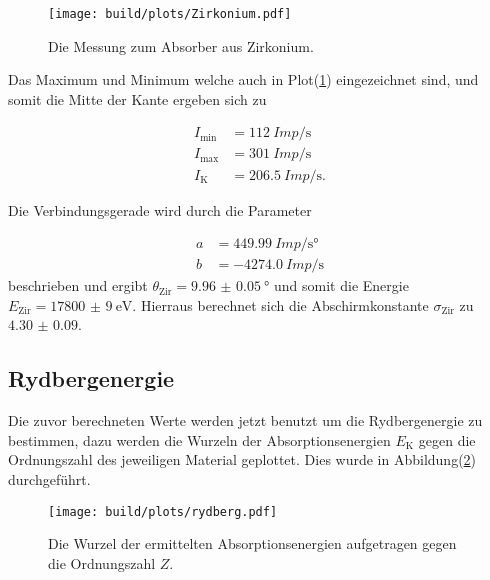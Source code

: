           \begin{figure}[H]
            \centering
            \texttt{[image: build/plots/Zirkonium.pdf]}
            \caption{Die Messung zum Absorber aus Zirkonium.}
            \label{fig:zirkonium}
          \end{figure}

          \noindent Das Maximum und Minimum welche auch in Plot(\ref{fig:zirkonium}) eingezeichnet sind, und somit die Mitte der Kante ergeben sich 
          zu

          \begin{align*}
              I_{\text{min}} &= \SI{112}{Imp\per\second}\\
              I_{\text{max}} &= \SI{301}{Imp\per\second}\\
              I_{\text{K}} &= \SI{206.5}{Imp\per\second} .
          \end{align*}

          \noindent Die Verbindungsgerade wird durch die Parameter 

          \begin{align*}
              a & = \SI{449.99}{Imp\per\second\degree}\\
              b & = \SI{-4274.0}{Imp\per\second}
          \end{align*}
          \noindent beschrieben und ergibt $\theta_{\text{Zir}} = \SI{9.96(5)}{\degree}$ und somit die Energie $E_{\text{Zir}} = \SI{17800(9)}{\electronvolt}$. 
          Hierraus berechnet sich die Abschirmkonstante $\sigma_{\text{Zir}}$ zu $ \num{4.30(9)}$.


    \subsection{Rydbergenergie}

          \noindent Die zuvor berechneten Werte werden jetzt benutzt um die Rydbergenergie zu bestimmen, dazu werden die Wurzeln der 
          Absorptionsenergien $E_{\text{K}}$ gegen die Ordnungszahl des jeweiligen Material geplottet. Dies wurde in 
          Abbildung(\ref{fig:rydberg}) durchgeführt.

          \begin{figure}[H]
            \centering
            \texttt{[image: build/plots/rydberg.pdf]}
            \caption{Die Wurzel der ermittelten Absorptionsenergien aufgetragen gegen die Ordnungszahl $Z$.}
            \label{fig:rydberg}
          \end{figure}

